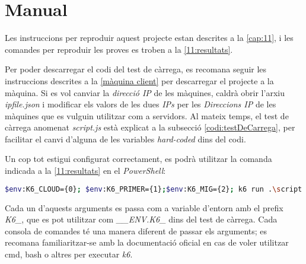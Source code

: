 \chapter{Manual}

Les instruccions per reproduir aquest projecte estan descrites a la \autoref{cap:11}, i les comandes per reproduir les proves es troben a la \autoref{11:resultats}.

Per poder descarregar el codi del test de càrrega, es recomana seguir les instruccions descrites a la \autoref{màquina client} per descarregar el projecte a la màquina. Si es vol canviar la \textit{direcció IP} de les màquines, caldrà obrir l'arxiu \textit{ipfile.json} i modificar els valors de les dues \textit{IPs} per les \textit{Direccions IP} de les màquines que es vulguin utilitzar com a servidors. Al mateix temps, el test de càrrega anomenat \textit{script.js} està explicat a la subsecció \ref{codi:testDeCarrega}, per facilitar el canvi d'alguna de les variables \textit{hard-coded} dins del codi.

Un cop tot estigui configurat correctament, es podrà utilitzar la comanda indicada a la \autoref{11:resultats} en el \textit{PowerShell}:


\begin{lstlisting}[language=bash, caption=Comanda per al test de càrrega]
    $env:K6_CLOUD={0}; $env:K6_PRIMER={1};$env:K6_MIG={2}; k6 run .\script.js
\end{lstlisting}

Cada un d'aquests arguments es passa com a variable d'entorn amb el prefix \textit{K6\_}, que es pot utilitzar com \textit{\_\_ENV.K6\_} dins del test de càrrega. Cada consola de comandes té una manera diferent de passar els arguments; es recomana familiaritzar-se amb la documentació oficial en cas de voler utilitzar cmd, bash o altres per executar \textit{k6}.\cite{stoykov_environment_nodate}